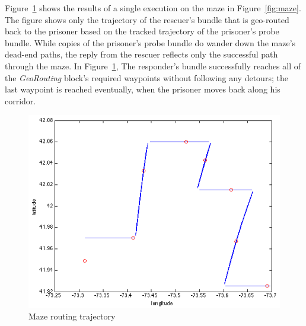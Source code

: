 Figure~\ref{fig:mazeExperiment} shows the results of a single
execution on the maze in Figure~\ref{fig:maze}. The figure shows only
the trajectory of the rescuer's bundle that is geo-routed back to the
prisoner based on the tracked trajectory of the prisoner's probe
bundle. While copies of the prisoner's probe bundle do wander down the
maze's dead-end paths, the reply from the rescuer reflects only the
successful path through the maze. In Figure~\ref{fig:mazeExperiment},
The responder's bundle successfully reaches all of the {\em
  GeoRouting} block's required waypoints without following any
detours; the last waypoint is reached eventually, when the prisoner
moves back along his corridor.
\begin{figure}
\begin{center}
\includegraphics[width=.8\columnwidth]{figures/mazeExperiment.png}
\end{center}
\vspace{-.75cm}
\caption{Maze routing trajectory}
\label{fig:mazeExperiment}
\vspace{-.5cm}
\end{figure}
